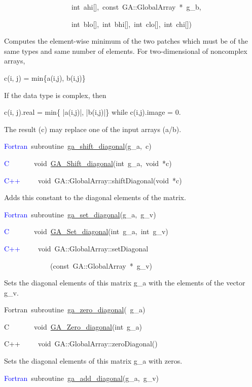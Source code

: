 ~~~~~~~~~~~~~~~~~~~int~ahi{[}{]},~const~GA::GlobalArray~{*}~g\_b,~

~~~~~~~~~~~~~~~~~~~int~blo{[}{]},~int~bhi{[}{]},~int~clo{[}{]},~int~chi{[}{]})

Computes the element-wise minimum of the two patches which must be
of the same types and same number of elements. For two-dimensional
of noncomplex arrays,

c(i, j) = min\{a(i,j), b(i,j)\}

If the data type is complex, then

c(i, j).real = min\{ |a(i,j)|, |b(i,j)|\} while c(i,j).image = 0.

The result (c) may replace one of the input arrays (a/b). 

\textcolor{blue}{Fortran}~subroutine~\href{https://hpc.pnl.gov/globalarrays/api/f_op_api.html\#ga_shift_diagonal}{ga\_{}shift\_{}diagonal}(g\_a,~c)~

\textcolor{blue}{C}~~~~~~~void~\href{https://hpc.pnl.gov/globalarrays/api/c_op_api.html\#ga_shift_diagonal}{GA\_{}Shift\_{}diagonal}(int~g\_a,~void~{*}c)~

\textcolor{blue}{C++}~~~~~void~GA::GlobalArray::shiftDiagonal(void~{*}c)

Adds this constant to the diagonal elements of the matrix.

\textcolor{blue}{Fortran}~subroutine~\href{https://hpc.pnl.gov/globalarrays/api/f_op_api.html\#ga_set_diagonal}{ga\_{}set\_{}diagonal}(g\_a,~g\_v)~

\textcolor{blue}{C}~~~~~~~void~\href{https://hpc.pnl.gov/globalarrays/api/c_op_api.html\#ga_set_diagonal}{GA\_{}Set\_{}diagonal}(int~g\_a,~int~g\_v)

\textcolor{blue}{C++}~~~~~void~GA::GlobalArray::setDiagonal~

~~~~~~~~~~~~~(const~GA::GlobalArray~{*}~g\_v)

Sets the diagonal elements of this matrix g\_a with the elements of
the vector g\_v.

Fortran~subroutine~\href{https://hpc.pnl.gov/globalarrays/api/f_op_api.html\#ga_zero_diagonal}{ga\_{}zero\_{}diagonal}(~g\_a)~

C~~~~~~~void~\href{https://hpc.pnl.gov/globalarrays/api/c_op_api.html\#ga_zero_diagonal}{GA\_{}Zero\_{}diagonal}(int~g\_a)~

C++~~~~~void~GA::GlobalArray::zeroDiagonal()

Sets the diagonal elements of this matrix g\_a with zeros. 

\textcolor{blue}{Fortran}~subroutine~\href{https://hpc.pnl.gov/globalarrays/api/f_op_api.html\#ga_add_diagonal}{ga\_{}add\_{}diagonal}(g\_a,~g\_v)~

